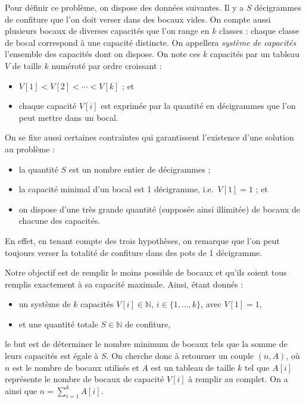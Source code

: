 \documentclass[12pt,a4paper]{article}
\begin{document}
Pour d\'efinir ce probl\`eme, on dispose des donn\'ees suivantes. Il y a $S$ d\'ecigrammes de confiture que l'on doit verser dans des bocaux vides. On compte aussi plusieurs bocaux de diverses capacit\'es que l'on range en $k$ classes : chaque classe de bocal correspond \`a une capacit\'e distincte. On appellera {\itshape syst\`eme de capacit\'es} l'ensemble des capacit\'es dont on dispose. On note ces $k$ capacit\'es par un tableau $V$ de taille $k$ num\'erot\'e par ordre croissant :
\begin{itemize}[\textbullet]
 \item $V[1] < V[2] < \cdots < V[k]$ ; et
 \item chaque capacit\'e $V[i]$ est exprim\'ee par la quantit\'e en d\'ecigrammes que l'on peut mettre dans un bocal.
\end{itemize}

\smallskip
On se fixe aussi certaines contraintes qui garantissent l'existence d'une solution au probl\`eme :
\begin{itemize}[\textbullet]
 \item la quantit\'e $S$ est un nombre entier de d\'ecigrammes ;
 \item la capacit\'e minimal d'un bocal est 1 d\'ecigramme, i.e.\ $V[1] = 1$ ; et
 \item on dispose d'une tr\`es grande quantit\'e (suppos\'ee ainsi illimit\'ee) de bocaux de chacune des capacit\'es.
\end{itemize}
En effet, en tenant compte des trois hypoth\`eses, on remarque que l'on peut toujours verser la totalit\'e de confiture dans des pots de 1 d\'ecigramme.

\bigskip
Notre objectif est de remplir le moins possible de bocaux et qu'ils soient tous remplis exactement \`a sa capacit\'e maximale. Ainsi, \'etant donn\'es :
\begin{itemize}
 \item un syst\`eme de $k$ capacit\'es $V[i] \in \mathbb{N}$, $i \in \{1,\dotsc,k\}$, avec $V[1]=1$,
 \item et une quantit\'e totale $S \in \mathbb{N}$ de confiture,
\end{itemize}
le but est de d\'eterminer le nombre minimum de bocaux tels que la somme de leurs capacit\'es est \'egale \`a $S$. On cherche donc \`a retourner un couple $(n,A)$, o\`u $n$ est le nombre de bocaux utilis\'es et $A$ est un tableau de taille $k$ tel que $A[i]$ repr\'esente le nombre de bocaux de capacit\'e $V[i]$ \`a remplir au complet. On a ainsi que $n = \sum_{i=1}^{k} A[i]$.
\end{document}
